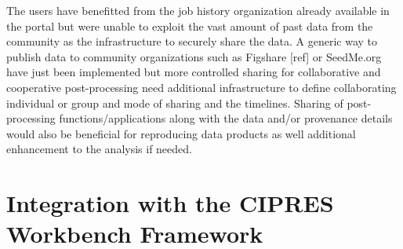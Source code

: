 \documentclass[sigconf]{acmart}
\begin{document}
The users have benefitted from the job history organization already available in the portal but were unable to exploit the vast amount of past data from the community as the infrastructure to securely share the data. A generic way to publish data to community organizations such as Figshare [ref] or SeedMe.org have just been implemented but more controlled sharing for collaborative and cooperative post-processing need additional infrastructure to define collaborating individual or group and mode of sharing and the timelines. Sharing of post-processing functions/applications along with the data and/or provenance details would also be beneficial for reproducing data products as well additional enhancement to the analysis if needed.

\section{Integration with the CIPRES Workbench Framework}
\end{document}
